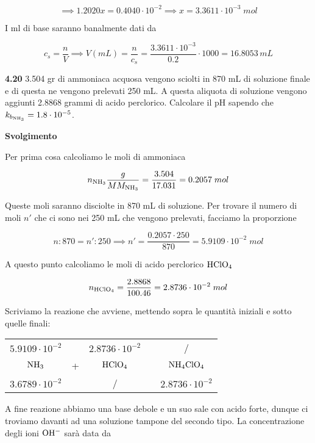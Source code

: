 $$\implies
1.2020 x = 0.4040 \cdot 10^{-2}
\implies x=3.3611 \cdot 10^{-3}\;mol$$

I ml di base saranno banalmente dati da

$$c_s=\frac{n}{V}
\implies
V(mL)=\frac{n}{c_s}=\frac{3.3611 \cdot 10^{-3}}{0.2} \cdot 1000
=16.8053\,mL$$



\vspace{0.2cm}\textbf{4.20} 3.504 gr di ammoniaca acquosa vengono sciolti in 870 mL di soluzione finale e di questa ne vengono prelevati 250 mL. A questa aliquota di soluzione vengono aggiunti 2.8868 grammi di acido perclorico. Calcolare il pH sapendo che $k_{b_{\rm NH_3}}=1.8 \cdot 10^{-5}$.

\vspace{0.2cm}\large\textbf{Svolgimento}\normalsize

\vspace{0.2cm}Per prima cosa calcoliamo le moli di ammoniaca

$$n_{\rm NH_3}\frac{g}{MM_{\rm NH_3}}
=\frac{3.504}{17.031}=0.2057\;mol$$

Queste moli saranno disciolte in 870 mL di soluzione. Per trovare il numero di moli $n'$ che ci sono nei 250 mL che vengono prelevati, facciamo la proporzione

$$n:870=n':250
\implies
n'=\frac{0.2057 \cdot 250}{870}=5.9109 \cdot 10^{-2}\;mol$$

A questo punto calcoliamo le moli di acido perclorico $\rm HClO_4$

$$n_{\rm HClO_4}=\frac{2.8868}{100.46}=2.8736 \cdot 10^{-2}\;mol$$

Scriviamo la reazione che avviene, mettendo sopra le quantità iniziali e sotto quelle finali:

\begin{center}
    \begin{tabular}{ccccc}
        $5.9109 \cdot 10^{-2}$ &  & $2.8736 \cdot 10^{-2}$ & & /\\
        $\rm NH_3$ & + & $\rm HClO_4$ & \ce{->} & $\rm NH_4ClO_4$\\
        $3.6789 \cdot 10^{-2}$ &  & / & & $2.8736 \cdot 10^{-2}$\\
    \end{tabular}
\end{center}

A fine reazione abbiamo una base debole e un suo sale con acido forte, dunque ci troviamo davanti ad una soluzione tampone del secondo tipo. La concentrazione degli ioni $\rm OH^-$ sarà data da

